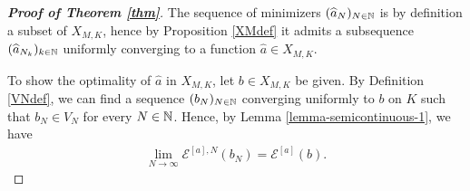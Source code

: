 \begin{proof}[\normalfont\bf Proof of Theorem \ref{thm}]

	The sequence of minimizers $(\widehat a_N)_{N \in \mathbb{N}}$ is by definition a subset of $X_{M,K}$, hence by Proposition \ref{XMdef} it admits a subsequence $(\widehat a_{N_k})_{k \in \mathbb{N}}$ uniformly converging to a function $\widehat a \in X_{M,K}$.
	
	To show the optimality of $\widehat a$ in $X_{M,K}$, let $b\in X_{M,K}$ be given. By Definition \ref{VNdef}, we can find a sequence $(b_N)_{N \in \mathbb{N}}$ converging uniformly to $b$ on $K$ such that $b_N\in V_N$ for every $N\in \mathbb{N}$. Hence, by Lemma \ref{lemma-semicontinuous-1}, we have
	\begin{align*}
		\lim_{N\rightarrow\infty} \mathcal E^{[a],N}(b_{N})= \mathcal E^{[a]}(b).
	\end{align*}
	

\end{proof}
